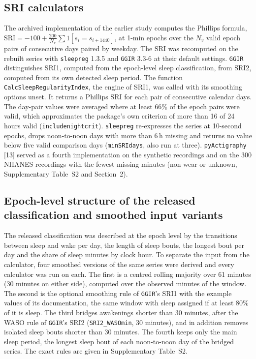 \documentclass[12pt]{article}
\begin{document}
\subsection{SRI calculators}
\label{sec:calculators}
The archived implementation of the earlier study computes the Phillips formula, $\mathrm{SRI} = -100 + \frac{200}{N_v}\sum 1[s_i = s_{i+1440}]$, at 1-min epochs over the $N_v$ valid epoch pairs of consecutive days paired by weekday. The SRI was recomputed on the rebuilt series with
\texttt{sleepreg} 1.3.5 and \texttt{GGIR} 3.3-6 at their default settings.
\texttt{GGIR} distinguishes SRI1, computed from the epoch-level sleep
classification, from SRI2, computed from its own detected sleep period. The function \texttt{CalcSleepRegularityIndex}, the engine of SRI1, was called
with its smoothing options unset. It returns a Phillips SRI for each pair of consecutive calendar days. The day-pair values were averaged where at least 66\% of the epoch pairs were valid, which approximates the package's own criterion of more than 16 of 24 hours valid (\texttt{includenightcrit}). \texttt{sleepreg} re-expresses the series at 10-second epochs,
drops noon-to-noon days with more than 6\,h missing and returns no value below
five valid comparison days (\texttt{minSRIdays}, also run at three). \texttt{pyActigraphy} [13] served as a fourth
implementation on the synthetic recordings and on the 300 NHANES recordings with the fewest missing minutes (non-wear or unknown, Supplementary Table~S2 and Section~2).

\subsection{Epoch-level structure of the released classification and smoothed input variants}
\label{sec:inputs}
The released classification was described at the epoch level by the
transitions between sleep and wake per day, the length of sleep bouts, the
longest bout per day and the share of sleep minutes by clock hour. To separate
the input from the calculator, four smoothed versions of the same series were
derived and every calculator was run on each. The first is a centred rolling majority over 61 minutes (30 minutes on either side), computed over the observed minutes of the window. The second is the optional smoothing rule of \texttt{GGIR}'s SRI1 with the example values of its documentation, the same window with sleep assigned if at least 80\% of it is sleep. The third bridges awakenings shorter than 30 minutes, after the WASO rule of \texttt{GGIR}'s SRI2 (\texttt{SRI2\_WASOmin}, 30 minutes), and in addition removes isolated sleep bouts shorter than 30 minutes. The
fourth keeps only the main sleep period, the longest sleep bout of each
noon-to-noon day of the bridged series. The exact rules are given in
Supplementary Table~S2.
\end{document}
